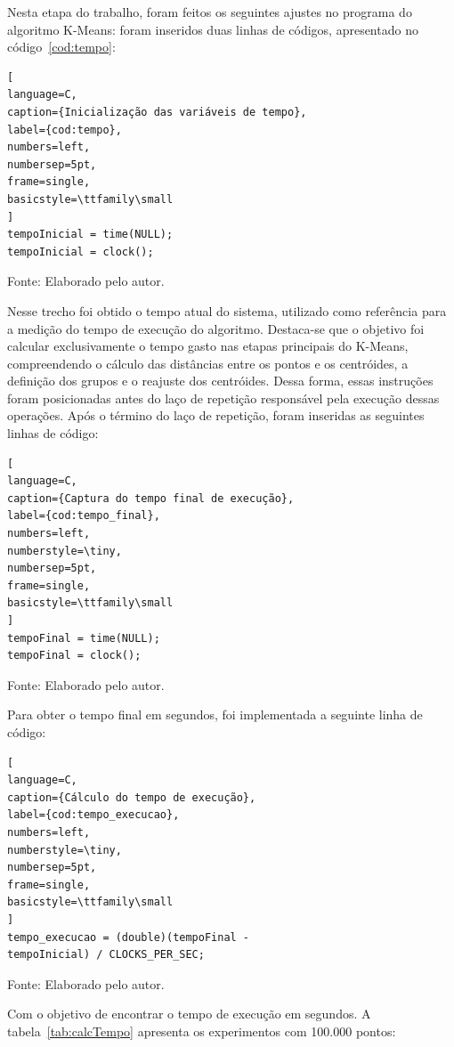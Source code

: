 \documentclass[10pt,a4paper,twocolumn]{article}
\begin{document}
Nesta etapa do trabalho, foram feitos os seguintes ajustes no programa do algoritmo K-Means: foram inseridos duas linhas de códigos, apresentado no código~\ref{cod:tempo}:

\begin{lstlisting}[
language=C,
caption={Inicialização das variáveis de tempo},
label={cod:tempo},
numbers=left,
numbersep=5pt,
frame=single,
basicstyle=\ttfamily\small
]
tempoInicial = time(NULL);
tempoInicial = clock();

\end{lstlisting}
\begin{center}
{\small Fonte: Elaborado pelo autor.}
\end{center} 

Nesse trecho foi obtido o tempo atual do sistema, utilizado como referência para a medição do tempo de execução do algoritmo. Destaca-se que o objetivo foi calcular exclusivamente o tempo gasto nas etapas principais do K-Means, compreendendo o cálculo das distâncias entre os pontos e os centróides, a definição dos grupos e o reajuste dos centróides. Dessa forma, essas instruções foram posicionadas antes do laço de repetição responsável pela execução dessas operações. Após o término do laço de repetição, foram inseridas as seguintes linhas de código:

\begin{lstlisting}[
language=C,
caption={Captura do tempo final de execução},
label={cod:tempo_final},
numbers=left,
numberstyle=\tiny,
numbersep=5pt,
frame=single,
basicstyle=\ttfamily\small
]
tempoFinal = time(NULL);
tempoFinal = clock();

\end{lstlisting}
\begin{center}
{\small Fonte: Elaborado pelo autor.}
\end{center} 

Para obter o tempo final em segundos, foi implementada a seguinte linha de código:
\begin{lstlisting}[
language=C,
caption={Cálculo do tempo de execução},
label={cod:tempo_execucao},
numbers=left,
numberstyle=\tiny,
numbersep=5pt,
frame=single,
basicstyle=\ttfamily\small
]
tempo_execucao = (double)(tempoFinal -
tempoInicial) / CLOCKS_PER_SEC;

\end{lstlisting}
\begin{center}
{\small Fonte: Elaborado pelo autor.}
\end{center} 

Com o objetivo de encontrar o tempo de execução em segundos. A tabela~\ref{tab:calcTempo} apresenta os experimentos com 100.000 pontos:
\end{document}
